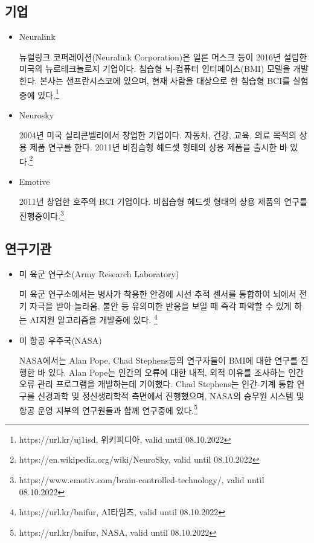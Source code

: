\documentclass[11pt, a4paper]{article}
\begin{document}
\subsection{기업}
\begin{itemize}
    \item Neuralink
    
    뉴럴링크 코퍼레이션(Neuralink Corporation)은 일론 머스크 등이 2016년 설립한 미국의 뉴로테크놀로지 기업이다. 침습형 뇌-컴퓨터 인터페이스(BMI) 모델을 개발한다. 본사는 샌프란시스코에 있으며, 현재 사람을 대상으로 한 침습형 BCI를 실험 중에 있다.\footnote{https://url.kr/uj1isd, 위키피디아, valid until 08.10.2022}
    \item Neurosky

    2004년 미국 실리콘벨리에서 창업한 기업이다. 자동차, 건강, 교육, 의료 목적의 상용 제품 연구를 한다. 2011년 비침습형 헤드셋 형태의 상용 제품을 출시한 바 있다.\footnote{https://en.wikipedia.org/wiki/NeuroSky, valid until 08.10.2022}
    \item Emotive
    
    2011년 창업한 호주의 BCI 기업이다. 비침습형 헤드셋 형태의 상용 제품의 연구를 진행중이다.\footnote{https://www.emotiv.com/brain-controlled-technology/, valid until 08.10.2022}
\end{itemize}

\subsection{연구기관}
\begin{itemize}
    \item 미 육군 연구소(Army Research Laboratory)

    미 육군 연구소에서는 병사가 착용한 안경에 시선 추적 센서를 통합하여 뇌에서 전기 자극을 받아 놀라움, 불안 등 유의미한 반응을 보일 때 즉각 파악할 수 있게 하는 AI지원 알고리즘을 개발중에 있다. \footnote{https://url.kr/bnifur, AI타임즈, valid until 08.10.2022}
    \item 미 항공 우주국(NASA)

    NASA에서는 Alan Pope, Chad Stephens등의 연구자들이 BMI에 대한 연구를 진행한 바 있다. Alan Pope는 인간의 오류에 대한 내적, 외적 이유를 조사하는 인간 오류 관리 프로그램을 개발하는데 기여했다. Chad Stephens는 인간-기계 통합 연구를 신경과학 및 정신생리학적 측면에서 진행했으며, NASA의 승무원 시스템 및 항공 운영 지부의 연구원들과 함께 연구중에 있다.\footnote{https://url.kr/bnifur, NASA, valid until 08.10.2022}
\end{itemize}
\end{document}
